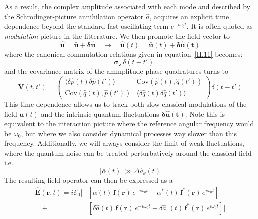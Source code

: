 As a result, the complex amplitude associated with each mode and described by the Schrodinger-picture annihilation operator $\hat{a}$, acquires an explicit time dependence beyond the standard fast-oscillating term $e^{-i\omega_0 t}$. It is often quoted as \textit{modulation} picture in the litterature. We then promote the field vector to 
\begin{equation}
\mathbf{\hat{u}}= \mathbf{\bar{u}} + \mathbf{\delta \hat{u}} \quad \rightarrow \quad
  \mathbf{\hat{u}}(t)=
 \mathbf{\bar{u}}(t) + \mathbf{\delta \hat{u}(t)}
\end{equation}
where the canonical commutation relations given in equation~\eqref{II.11} becomes:
\begin{equation}
  [\delta\mathbf{\hat{u}}(t), \delta \mathbf{\hat{u}}(t')^{\dagger}] = \mathbf{\sigma_z} \, \delta (t-t').
\end{equation}
and the covariance matrix of the ammplitude-phase quadratures turns to
\begin{equation}
\mathbf{V}(t, t') = \begin{pmatrix}
\langle \delta \hat{p}(t) \delta \hat{p}(t') \rangle &
\mathrm{Cov}(\hat{p}(t),\hat{q}(t')) \\[4pt]
\mathrm{Cov}(\hat{q}(t),\hat{p}(t'))  &
\langle \delta \hat{q}(t) \delta \hat{q}(t') \rangle 
\end{pmatrix} \delta(t-t')
\end{equation}
This time dependence allows us to track both slow classical modulations of the field $\mathbf{\bar{u}}(t)$ and the intrinsic quantum fluctuations $\mathbf{\delta \hat{u}(t)}$. Note this is equivalent to the interaction picture where the reference angular frequency would be $\omega_0$, but where we also consider dynamical processes way slower than this frequency. Additionally, we will always consider the limit of weak fluctuations, where the quantum noise can be treated perturbatively around the classical field i.e. 
\[
|\bar{\alpha}(t)| \gg \Delta \hat a_\theta(t)
\]
The resulting field operator can then be expressed as a 
\begin{equation}
\begin{aligned}
\hat{\mathbf{E}}(\mathbf{r}, t) 
=i  \mathcal{E}_0 \bigg[ & \left[ \alpha(t)\, \mathbf{f}(\mathbf{r})\, e^{-i \omega_0 t} 
- \alpha^*(t)\, \mathbf{f}^*(\mathbf{r})\, e^{i \omega_0 t} \right] \\
\quad +  &\left[ \delta \hat{a}(t)\, \mathbf{f}(\mathbf{r})\, e^{-i \omega_0 t}
- \delta \hat{a}^\dagger(t)\, \mathbf{f}^*(\mathbf{r})\, e^{i \omega_0 t} \right] \bigg]
\end{aligned}
\end{equation} 

